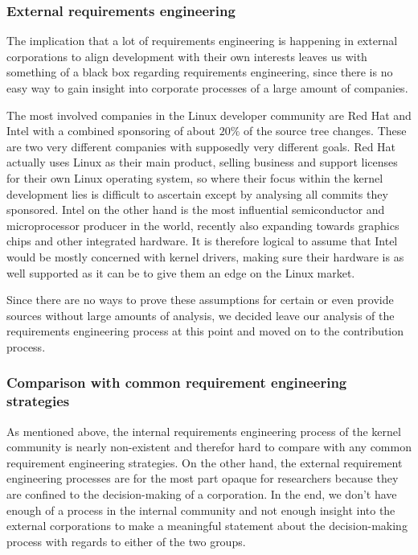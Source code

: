\documentclass{sig-alternate-05-2015}
\begin{document}
\subsubsection{External requirements engineering}

The implication that a lot of requirements engineering is happening in external corporations to align development with their own interests leaves us with something of a black box regarding requirements engineering, since there is no easy way to gain insight into corporate processes of a large amount of companies.

The most involved companies in the Linux developer community are Red Hat and Intel with a combined sponsoring of about \(20\%\) of the source tree changes.
These are two very different companies with supposedly very different goals.
Red Hat actually uses Linux as their main product, selling business and support licenses for their own Linux operating system, so where their focus within the kernel development lies is difficult to ascertain except by analysing all commits they sponsored.
Intel on the other hand is the most influential semiconductor and microprocessor producer in the world, recently also expanding towards graphics chips and other integrated hardware.
It is therefore logical to assume that Intel would be mostly concerned with kernel drivers, making sure their hardware is as well supported as it can be to give them an edge on the Linux market.

Since there are no ways to prove these assumptions for certain or even provide sources without large amounts of analysis, we decided leave our analysis of the requirements engineering process at this point and moved on to the contribution process.

\subsubsection{Comparison with common requirement engineering strategies}

As mentioned above, the internal requirements engineering process of the kernel community is nearly non-existent and therefor hard to compare with any common requirement engineering strategies.
On the other hand, the external requirement engineering processes are for the most part opaque for researchers because they are confined to the decision-making of a corporation.
In the end, we don't have enough of a process in the internal community and not enough insight into the external corporations to make a meaningful statement about the decision-making process with regards to either of the two groups.
\end{document}
